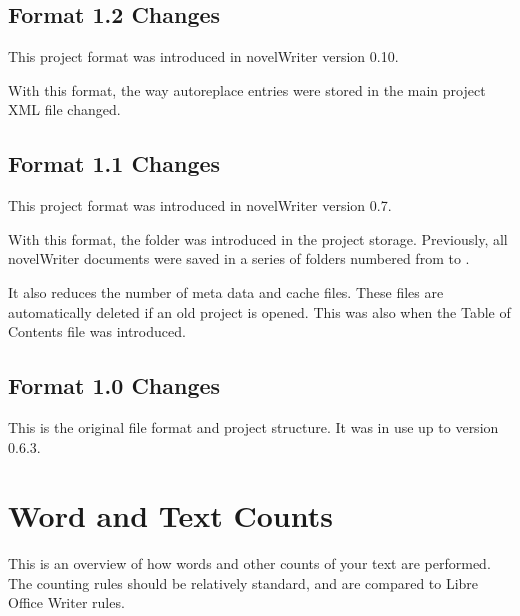 \documentclass[a4paper,11pt,english]{sphinxmanual}
\begin{document}
\section{Format 1.2 Changes}
\label{\detokenize{more_projectformat:format-1-2-changes}}\label{\detokenize{more_projectformat:a-prjfmt-1-2}}
\sphinxAtStartPar
This project format was introduced in novelWriter version 0.10.

\sphinxAtStartPar
With this format, the way auto\sphinxhyphen{}replace entries were stored in the main project XML file changed.


\section{Format 1.1 Changes}
\label{\detokenize{more_projectformat:format-1-1-changes}}\label{\detokenize{more_projectformat:a-prjfmt-1-1}}
\sphinxAtStartPar
This project format was introduced in novelWriter version 0.7.

\sphinxAtStartPar
With this format, the  folder was introduced in the project storage. Previously, all
novelWriter documents were saved in a series of folders numbered from  to .

\sphinxAtStartPar
It also reduces the number of meta data and cache files. These files are automatically deleted if
an old project is opened. This was also when the Table of Contents file was introduced.


\section{Format 1.0 Changes}
\label{\detokenize{more_projectformat:format-1-0-changes}}\label{\detokenize{more_projectformat:a-prjfmt-1-0}}
\sphinxAtStartPar
This is the original file format and project structure. It was in use up to version 0.6.3.

\sphinxstepscope


\chapter{Word and Text Counts}
\label{\detokenize{more_counting:word-and-text-counts}}\label{\detokenize{more_counting:a-counting}}\label{\detokenize{more_counting::doc}}
\sphinxAtStartPar
This is an overview of how words and other counts of your text are performed. The counting rules
should be relatively standard, and are compared to Libre Office Writer rules.
\end{document}
